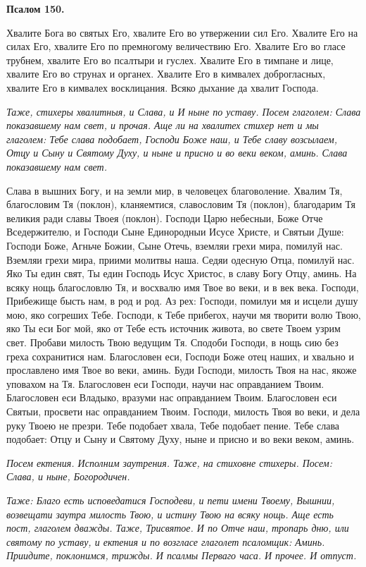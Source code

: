 \medskip


\bfseries Псалом 150.\normalfont{}\nopagebreak


Хвалите Бога во святых Его, хвалите Его во утвержении сил Его. Хвалите Его на силах Его, хвалите Его по премногому величествию Его. Хвалите Его во гласе трубнем, хвалите Его во псалтыри и гуслех. Хвалите Его в тимпане и лице, хвалите Его во струнах и органех. Хвалите Его в кимвалех доброгласных, хвалите Его в кимвалех восклицания. Всяко дыхание да хвалит Господа.


\itshape Таже, стихеры хвалитныя, и Слава, и И ныне по уставу. Посем глаголем:\normalfont{} Слава показавшему нам свет, и прочая. Аще ли на хвалитех стихер нет и мы глаголем: Тебе слава подобает, Господи Боже наш, и Тебе славу возсылаем, Отцу и Сыну и Святому Духу, и ныне и присно и во веки веком, аминь. Слава показавшему нам свет. 

Слава в вышних Богу, и на земли мир, в человецех благоволение. Хвалим Тя, благословим Тя (поклон), кланяемтися, славословим Тя (поклон), благодарим Тя великия ради славы Твоея (поклон). Господи Царю небесныи, Боже Отче Вседержителю, и Господи Сыне Единородныи Исусе Христе, и Святыи Душе: Господи Боже, Агньче Божии, Сыне Отечь, вземляи грехи мира, помилуй нас. Вземляи грехи мира, приими молитвы наша. Седяи одесную Отца, помилуй нас. Яко Ты един свят, Ты един Господь Исус Христос, в славу Богу Отцу, аминь. На всяку нощь благословлю Тя, и восхвалю имя Твое во веки, и в век века. Господи, Прибежище бысть нам, в род и род. Аз рех: Господи, помилуи мя и исцели душу мою, яко согреших Тебе. Господи, к Тебе прибегох, научи мя творити волю Твою, яко Ты еси Бог мой, яко от Тебе есть источник живота, во свете Твоем узрим свет. Пробави милость Твою ведущим Тя. Сподоби Господи, в нощь сию без греха сохранитися нам. Благословен еси, Господи Боже отец наших, и хвально и прославлено имя Твое во веки, аминь. Буди Господи, милость Твоя на нас, якоже уповахом на Тя. Благословен еси Господи, научи нас оправданием Твоим. Благословен еси Владыко, вразуми нас оправданием Твоим. Благословен еси Святыи, просвети нас оправданием Твоим. Господи, милость Твоя во веки, и дела руку Твоею не презри. Тебе подобает хвала, Тебе подобает пение. Тебе слава подобает: Отцу и Сыну и Святому Духу, ныне и присно и во веки веком, аминь.


\itshape Посем ектения.\normalfont{} Исполним заутрения. Таже, на стиховне стихеры. Посем: Слава, и ныне, Богородичен.


\itshape Таже:\normalfont{} Благо есть исповедатися Господеви, и пети имени Твоему, Вышнии, возвещати заутра милость Твою, и истину Твою на всяку нощь. Аще есть пост, глаголем дважды. Таже, Трисвятое. И по Отче наш, тропарь дню, или святому по уставу, и ектения и по возгласе глаголет псаломщик: Аминь. Приидите, поклонимся, трижды. И псалмы Перваго часа. И прочее. И отпуст.



